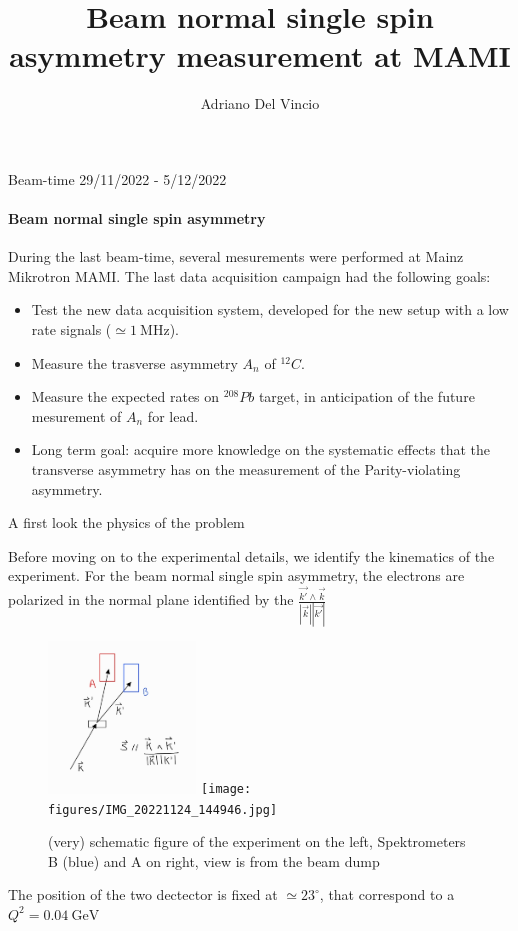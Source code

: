 \documentclass[8pt,a4paper]{beamer}
\author{Adriano Del Vincio}
\title{Beam normal single spin asymmetry measurement at MAMI}
\begin{document}
\frame{\titlepage}

\begin{frame}{Beam-time 29/11/2022 - 5/12/2022}
\framesubtitle{Beam normal single spin asymmetry}
During the last beam-time, several mesurements were performed at Mainz Mikrotron MAMI. The last data acquisition campaign had the following goals:

\begin{itemize}
\item Test the new data acquisition system, developed for the new setup with a low rate signals ($\simeq \SI{1}{\mega \hertz} $). 
\item Measure the trasverse asymmetry $A_{n}$ of $^{12}C$.
\item Measure the expected rates on $^{208}Pb$ target, in anticipation of the future mesurement of $A_{n}$ for lead. 
\item Long term goal: acquire more knowledge on the systematic effects that the transverse asymmetry has on the measurement of the Parity-violating asymmetry.
\end{itemize}

\end{frame}

\begin{frame}{A first look the physics of the problem}

Before moving on to the experimental details, we identify the kinematics of the experiment. For the beam normal single spin asymmetry, the electrons are polarized in the normal plane identified by the $\frac{\vec{k'} \wedge \vec{k}}{ |\vec{k}| |\vec{k'}|}$ 

\begin{figure}[hbtp]
\centering
\includegraphics[width = 0.35\textwidth]{figures/SmartSelect_20221204_171028_Samsung Notes.jpg}
\hspace{2cm}
\texttt{[image: figures/IMG\_20221124\_144946.jpg]} 
\caption{(very) schematic figure of the experiment on the left, Spektrometers B (blue) and A on right, view is from the beam dump}
\end{figure}
The position of the two dectector is fixed at $\simeq 23 ^{\circ}$, that correspond to a $Q^{2} = \SI{0.04} {\giga \electronvolt}$

\end{frame}
\end{document}
